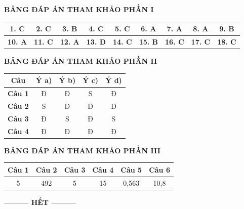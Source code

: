 \documentclass[12pt,a4paper]{article}
\begin{document}
\newpage
\noindent\textbf{\large BẢNG ĐÁP ÁN THAM KHẢO PHẦN I}
\vspace{0.2cm}

\begin{center}
\begin{tabular}{|c|c|c|c|c|c|c|c|c|}
\hline
\textbf{1. C} & \textbf{2. C} & \textbf{3. B} & \textbf{4. C} & \textbf{5. C} & \textbf{6. A} & \textbf{7. A} & \textbf{8. A} & \textbf{9. B} \\
\hline
\textbf{10. A} & \textbf{11. C} & \textbf{12. A} & \textbf{13. D} & \textbf{14. C} & \textbf{15. B} & \textbf{16. C} & \textbf{17. C} & \textbf{18. C} \\
\hline
\end{tabular}
\end{center}

\bigskip
\noindent\textbf{\large BẢNG ĐÁP ÁN THAM KHẢO PHẦN II}
\vspace{0.2cm}

\begin{center}
\begin{tabular}{|c|c|c|c|c|}
\hline
\textbf{Câu} & \textbf{Ý a)} & \textbf{Ý b)} & \textbf{Ý c)} & \textbf{Ý d)} \\
\hline
\textbf{Câu 1} & Đ & Đ & S & Đ \\
\hline
\textbf{Câu 2} & S & Đ & Đ & Đ \\
\hline
\textbf{Câu 3} & Đ & S & Đ & S \\
\hline
\textbf{Câu 4} & Đ & Đ & Đ & Đ \\
\hline
\end{tabular}
\end{center}

\bigskip
\noindent\textbf{\large BẢNG ĐÁP ÁN THAM KHẢO PHẦN III}
\vspace{0.2cm}

\begin{center}
\begin{tabular}{|c|c|c|c|c|c|}
\hline
\textbf{Câu 1} & \textbf{Câu 2} & \textbf{Câu 3} & \textbf{Câu 4} & \textbf{Câu 5} & \textbf{Câu 6} \\
\hline
5 & 492 & 5 & 15 & 0{,}563 & 10{,}8 \\
\hline
\end{tabular}
\end{center}

\begin{center}
\textbf{--------- HẾT ---------}
\end{center}
\end{document}
